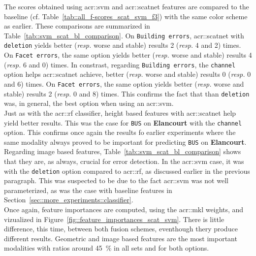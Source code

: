             The scores obtained using \gls{acr::svm} and \gls{acr::scatnet} features are compared to the baseline (cf. Table~\ref{tab::all_f-scores_scat_svm_f3}) with the same color scheme as earlier.
            These comparisons are summarized in Table~\ref{tab::svm_scat_bl_comparison}.
            On \texttt{Building errors}, \gls{acr::scatnet} with \texttt{deletion} yields better (\textit{resp.} worse and stable) results 2 (\textit{resp.} 4 and 2) times.
            On \texttt{Facet errors}, the same option yields better (\textit{resp.} worse and stable) results 4 (\textit{resp.} 6 and 0) times.
            In constrast, regarding \texttt{Building errors}, the \texttt{channel} option helps \gls{acr::scatnet} achieve, better (\textit{resp.} worse and stable) results 0 (\textit{resp.} 0 and 6) times.
            On \texttt{Facet errors}, the same option yields better (\textit{resp.} worse and stable) results 2 (\textit{resp.} 0 and 8) times.
            This confirms the fact that than \texttt{deletion} was, in general, the best option when using an \gls{acr::svm}.\\

            Just as with the \gls{acr::rf} classifier, height based features with \gls{acr::scatnet} help yield better results.
            This was the case for \texttt{BUS} on \textbf{Elancourt} with the \texttt{channel} option.
            This confirms once again the results fo earlier experiments where the same modality always proved to be important for predicting \texttt{BUS} on \textbf{Elancourt}.
            Regarding image based features, Table~\ref{tab::svm_scat_bl_comparison} shows that they are, as always, crucial for error detection.
            In the \gls{acr::svm} case, it was with the \texttt{deletion} option compared to \gls{acr::rf}, as discussed earlier in the previous paragraph.
            This was suspected to be due to the fact \gls{acr::svm} was not well parameterized, as was the case with baseline features in Section~\ref{sec::more_experiments::classifier}.\\

            Once again, feature importances are computed, using the \gls{acr::mkl} weights, and vizualized in Figure~\ref{fig::feature_importances_scat_svm}.
            There is little difference, this time, between both fusion schemes, eventhough thery produce different results.
            Geometric and image based features are the most important modalities with ratios around \SI{45}{\percent} in all sets and for both options.\\


